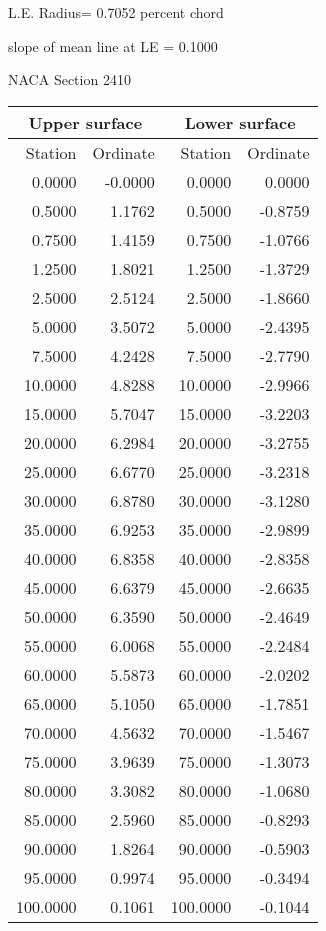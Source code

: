 \documentclass[11pt]{book}
\begin{document}
L.E. Radius=  0.7052 percent chord


 slope of mean line at LE =  0.1000
 \newpage
  \label{s2410}
 \begin{Large}
 NACA Section 2410
 \end{Large}
  
 \vspace{8mm}
 \begin{tabular}{|r|r|r|r|} \hline 
 \multicolumn{2}{|c|}{Upper surface} & \multicolumn{2}{|c|}{Lower surface} \\
 \hline
 Station & Ordinate & Station & Ordinate \\
 \hline
0.0000 & -0.0000 & 0.0000 & 0.0000 \\
0.5000 & 1.1762 & 0.5000 & -0.8759 \\
0.7500 & 1.4159 & 0.7500 & -1.0766 \\
1.2500 & 1.8021 & 1.2500 & -1.3729 \\
2.5000 & 2.5124 & 2.5000 & -1.8660 \\
5.0000 & 3.5072 & 5.0000 & -2.4395 \\
7.5000 & 4.2428 & 7.5000 & -2.7790 \\
10.0000 & 4.8288 & 10.0000 & -2.9966 \\
15.0000 & 5.7047 & 15.0000 & -3.2203 \\
20.0000 & 6.2984 & 20.0000 & -3.2755 \\
25.0000 & 6.6770 & 25.0000 & -3.2318 \\
30.0000 & 6.8780 & 30.0000 & -3.1280 \\
35.0000 & 6.9253 & 35.0000 & -2.9899 \\
40.0000 & 6.8358 & 40.0000 & -2.8358 \\
45.0000 & 6.6379 & 45.0000 & -2.6635 \\
50.0000 & 6.3590 & 50.0000 & -2.4649 \\
55.0000 & 6.0068 & 55.0000 & -2.2484 \\
60.0000 & 5.5873 & 60.0000 & -2.0202 \\
65.0000 & 5.1050 & 65.0000 & -1.7851 \\
70.0000 & 4.5632 & 70.0000 & -1.5467 \\
75.0000 & 3.9639 & 75.0000 & -1.3073 \\
80.0000 & 3.3082 & 80.0000 & -1.0680 \\
85.0000 & 2.5960 & 85.0000 & -0.8293 \\
90.0000 & 1.8264 & 90.0000 & -0.5903 \\
95.0000 & 0.9974 & 95.0000 & -0.3494 \\
100.0000 & 0.1061 & 100.0000 & -0.1044 \\
 \hline 
 \end{tabular}
\end{document}
